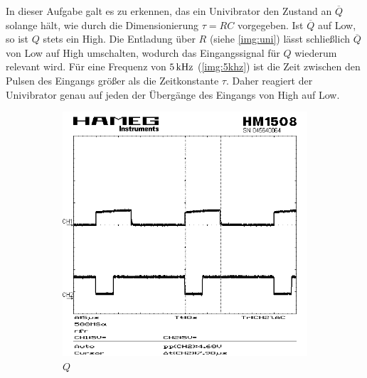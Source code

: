 \documentclass[numbers=noenddot,12pt,a4paper]{scrartcl}
\newcommand{\nicht}[1]{\overline{#1}}
\begin{document}
In dieser Aufgabe galt es zu erkennen, das ein Univibrator den Zustand an $\nicht{Q}$ solange hält, wie durch die Dimensionierung $\tau=RC$ vorgegeben. Ist $\nicht{Q}$ auf Low, so ist $Q$ stets ein High. Die Entladung über $R$ (siehe \ref{img:uni}) lässt schließlich $\nicht{Q}$ von Low auf High umschalten, wodurch das Eingangssignal für $Q$ wiederum relevant wird. Für eine Frequenz von $\unit[5]{kHz}$ (\ref{img:5khz}) ist die Zeit zwischen den Pulsen des Eingangs größer als die Zeitkonstante $\tau$. Daher reagiert der Univibrator genau auf jeden der Übergänge des Eingangs von High auf Low.
\begin{figure}[H]
\centering
\begin{subfigure}[b]{0.48\textwidth}
\includegraphics[width=\textwidth]{seq150khzq.png}
\caption{$Q$}
\end{subfigure}
\begin{subfigure}[b]{0.48\textwidth}

\end{subfigure}
\end{figure}
\end{document}
